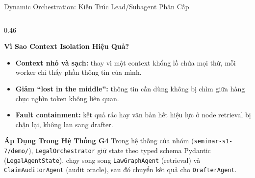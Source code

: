 \documentclass[aspectratio=1610,10pt,xcolor={table}]{beamer}
\begin{document}
\begin{frame}{Dynamic Orchestration: Kiến Trúc Lead/Subagent Phân Cấp}
\begin{columns}[t]
    \begin{column}{0.46\textwidth}
      \begin{alertblock}{\textbf{Vì Sao Context Isolation Hiệu Quả?}}
        \scriptsize
        \begin{itemize}
          \item \textbf{Context nhỏ và sạch:} thay vì một context khổng lồ chứa mọi thứ, mỗi worker chỉ thấy phần thông tin của mình.
          \item \textbf{Giảm ``lost in the middle'':} thông tin cần dùng không bị chìm giữa hàng chục nghìn token không liên quan.
          \item \textbf{Fault containment:} kết quả rác hay văn bản hết hiệu lực ở node retrieval bị chặn lại, không lan sang drafter.
        \end{itemize}
      \end{alertblock}
      \vspace{0.08cm}
      \begin{block}{\scriptsize \textbf{Áp Dụng Trong Hệ Thống G4}}
        \tiny Trong hệ thống của nhóm (\texttt{seminar-s1-7/demo/}), \texttt{LegalOrchestrator} giữ state theo typed schema Pydantic (\texttt{LegalAgentState}), chạy song song \texttt{LawGraphAgent} (retrieval) và \texttt{ClaimAuditorAgent} (audit oracle), sau đó chuyển kết quả cho \texttt{DrafterAgent}.
      \end{block}
    \end{column}
  \end{columns}
\end{frame}
\end{document}
